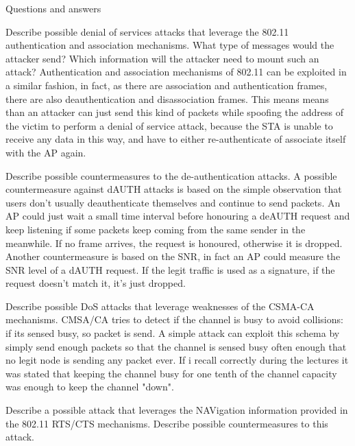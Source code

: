 \begin{section}{Questions and answers}
  \begin{subsubsection}{Describe possible denial of services attacks that leverage the 802.11
    authentication and association mechanisms. What type of messages would the attacker send? Which
  information will the attacker need to mount such an attack?}
    Authentication and association mechanisms of 802.11 can be exploited in a similar fashion, in
    fact, as there are association and authentication frames, there are also deauthentication and
    disassociation frames. This means means than an attacker can just send this kind of packets
    while spoofing the address of the victim to perform a denial of service attack, because the STA
    is unable to receive any data in this way, and have to either re-authenticate of associate
    itself with the AP again.
  \end{subsubsection}
  \begin{subsubsection}{Describe possible countermeasures to the de-authentication attacks.}
    A possible countermeasure against dAUTH attacks is based on the simple observation that users
    don't usually deauthenticate themselves and continue to send packets. An AP could just wait a
    small time interval before honouring a deAUTH request and keep listening if some packets keep
    coming from the same sender in the meanwhile. If no frame arrives, the request is honoured,
    otherwise it is dropped.\\ 
    Another countermeasure is based on the SNR, in fact an AP could measure the SNR level of a dAUTH
    request. If the legit traffic is used as a signature, if the request doesn't match it, it's just
    dropped.
  \end{subsubsection}
  \begin{subsubsection}{Describe possible DoS attacks that leverage weaknesses of the CSMA-CA
    mechanisms.}
    CMSA/CA tries to detect if the channel is busy to avoid collisions: if its sensed busy, so
    packet is send. A simple attack can exploit this schema by simply send enough packets so that
    the channel is sensed busy often enough that no legit node is sending any packet ever. If i
    recall correctly during the lectures it was stated that keeping the channel busy for one tenth
    of the channel capacity was enough to keep the channel "down".
  \end{subsubsection}
  \begin{subsubsection}{Describe a possible attack that leverages the NAVigation information
    provided in the 802.11 RTS/CTS mechanisms. Describe possible countermeasures to this attack.}

\end{subsubsection}
\end{section}
